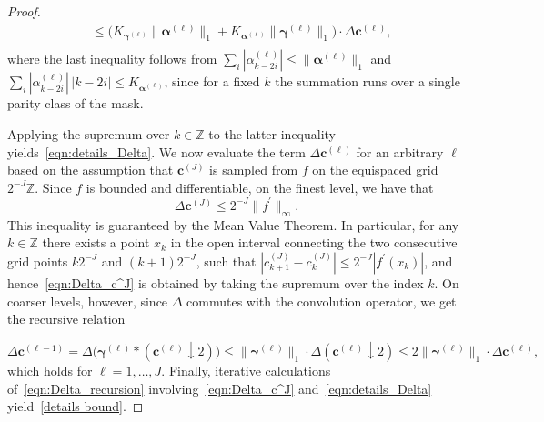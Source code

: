 \documentclass[10pt,a4paper]{amsart}
\begin{document}
\begin{proof}
\begin{equation*}
\begin{split}
        & \leq \Big(K_{\boldsymbol{\gamma}^{(\ell)}}\|\boldsymbol{\alpha}^{(\ell)}\|_1+K_{\boldsymbol{\alpha}^{(\ell)}} \|\boldsymbol{\gamma}^{(\ell)}\|_1\Big) \cdot \Delta\boldsymbol{c}^{(\ell)},\\
    \end{split}
    \end{equation*}
    where the last inequality follows from $\sum_i|\alpha^{(\ell)}_{k-2i}|\leq\|\boldsymbol{\alpha}^{(\ell)}\|_1$ and $\sum_i|\alpha^{(\ell)}_{k-2i}|\,|k-2i|\leq K_{\boldsymbol{\alpha}^{(\ell)}}$, since for a fixed $k$ the summation runs over a single parity class of the mask.

    Applying the supremum over $k\in\mathbb{Z}$ to the latter inequality yields~\eqref{eqn:details_Delta}. We now evaluate the term $\Delta\boldsymbol{c}^{(\ell)}$ for an arbitrary $\ell$ based on the assumption that $\boldsymbol{c}^{(J)}$ is sampled from $f$ on the equispaced grid $2^{-J}\mathbb{Z}$. Since $f$ is bounded and differentiable, on the finest level, we have that
    \begin{equation}\label{eqn:Delta_c^J}
        \Delta\boldsymbol{c}^{(J)}\leq 2^{-J}\|f^\prime\|_{\infty}.
    \end{equation}
    This inequality is guaranteed by the Mean Value Theorem. In particular, for any $k\in\mathbb{Z}$ there exists a point $x_k$ in the open interval connecting the two consecutive grid points $k2^{-J}$ and $(k+1)2^{-J}$, such that $|c^{(J)}_{k+1}-c^{(J)}_{k}|\leq 2^{-J}|f^\prime (x_k)|$, and hence~\eqref{eqn:Delta_c^J} is obtained by taking the supremum over the index $k$. On coarser levels, however, since $\Delta$ commutes with the convolution operator, we get the recursive relation

    \begin{equation}\label{eqn:Delta_recursion}
        \Delta\boldsymbol{c}^{(\ell-1)} = \Delta\big(\boldsymbol{\gamma}^{(\ell)}*(\boldsymbol{c}^{(\ell)}\downarrow 2)\big)\leq \|\boldsymbol{\gamma}^{(\ell)}\|_1\cdot\Delta(\boldsymbol{c}^{(\ell)}\downarrow 2)\leq 2\|\boldsymbol{\gamma}^{(\ell)}\|_1\cdot\Delta\boldsymbol{c}^{(\ell)},
    \end{equation}
    which holds for $\ell=1,\dots,J$. Finally, iterative calculations of~\eqref{eqn:Delta_recursion} involving~\eqref{eqn:Delta_c^J} and~\eqref{eqn:details_Delta} yield~\eqref{details bound}.
\end{proof}
\end{document}
